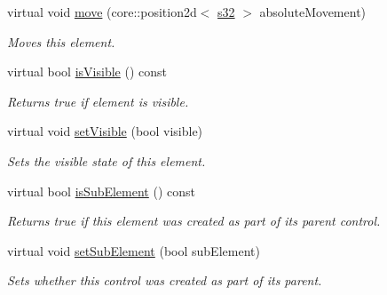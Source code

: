 \begin{DoxyCompactItemize}
\mbox{\label{classirr_1_1gui_1_1IGUIElement_a842eeacfcb26865416b084593a774704}} 
virtual void \hyperlink{classirr_1_1gui_1_1IGUIElement_a842eeacfcb26865416b084593a774704}{move} (core\+::position2d$<$ \hyperlink{namespaceirr_ac66849b7a6ed16e30ebede579f9b47c6}{s32} $>$ absolute\+Movement)
\begin{DoxyCompactList}\small\item\em Moves this element. \end{DoxyCompactList}\item 
\mbox{\label{classirr_1_1gui_1_1IGUIElement_a9cb14270ab55bdfe45442542b35567a7}} 
virtual bool \hyperlink{classirr_1_1gui_1_1IGUIElement_a9cb14270ab55bdfe45442542b35567a7}{is\+Visible} () const
\begin{DoxyCompactList}\small\item\em Returns true if element is visible. \end{DoxyCompactList}\item 
\mbox{\label{classirr_1_1gui_1_1IGUIElement_aed537cb0b16c670b8f895179f0027bad}} 
virtual void \hyperlink{classirr_1_1gui_1_1IGUIElement_aed537cb0b16c670b8f895179f0027bad}{set\+Visible} (bool visible)
\begin{DoxyCompactList}\small\item\em Sets the visible state of this element. \end{DoxyCompactList}\item 
\mbox{\label{classirr_1_1gui_1_1IGUIElement_aa85661a9ebba0f46d6e7c7e0da92f4cd}} 
virtual bool \hyperlink{classirr_1_1gui_1_1IGUIElement_aa85661a9ebba0f46d6e7c7e0da92f4cd}{is\+Sub\+Element} () const
\begin{DoxyCompactList}\small\item\em Returns true if this element was created as part of its parent control. \end{DoxyCompactList}\item 
virtual void \hyperlink{classirr_1_1gui_1_1IGUIElement_a50eb859808b65ee24fbdd69e69118a8d}{set\+Sub\+Element} (bool sub\+Element)
\begin{DoxyCompactList}\small\item\em Sets whether this control was created as part of its parent. \end{DoxyCompactList}\item 

\end{DoxyCompactItemize}
